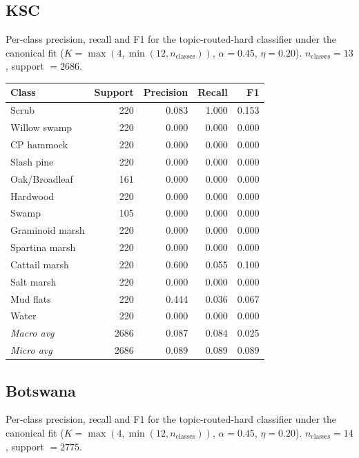 \subsection*{KSC}
Per-class precision, recall and F1 for the topic-routed-hard classifier under the canonical fit ($K = \max(4, \min(12, n_{\text{classes}}))$, $\alpha = 0.45$, $\eta = 0.20$). $n_{\text{classes}} = 13$, support $= 2686$.

\begin{tabular}{lrrrr}
\toprule
Class & Support & Precision & Recall & F1 \\
\midrule
Scrub & 220 & 0.083 & 1.000 & 0.153 \\
Willow swamp & 220 & 0.000 & 0.000 & 0.000 \\
CP hammock & 220 & 0.000 & 0.000 & 0.000 \\
Slash pine & 220 & 0.000 & 0.000 & 0.000 \\
Oak/Broadleaf & 161 & 0.000 & 0.000 & 0.000 \\
Hardwood & 220 & 0.000 & 0.000 & 0.000 \\
Swamp & 105 & 0.000 & 0.000 & 0.000 \\
Graminoid marsh & 220 & 0.000 & 0.000 & 0.000 \\
Spartina marsh & 220 & 0.000 & 0.000 & 0.000 \\
Cattail marsh & 220 & 0.600 & 0.055 & 0.100 \\
Salt marsh & 220 & 0.000 & 0.000 & 0.000 \\
Mud flats & 220 & 0.444 & 0.036 & 0.067 \\
Water & 220 & 0.000 & 0.000 & 0.000 \\
\midrule
\textit{Macro avg} & 2686 & 0.087 & 0.084 & 0.025 \\
\textit{Micro avg} & 2686 & 0.089 & 0.089 & 0.089 \\
\bottomrule
\end{tabular}

\subsection*{Botswana}
Per-class precision, recall and F1 for the topic-routed-hard classifier under the canonical fit ($K = \max(4, \min(12, n_{\text{classes}}))$, $\alpha = 0.45$, $\eta = 0.20$). $n_{\text{classes}} = 14$, support $= 2775$.

